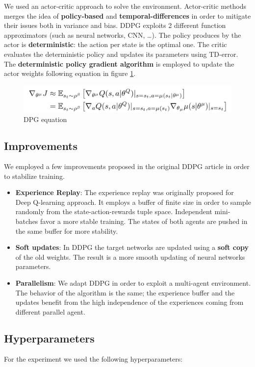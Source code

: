 \documentclass[11pt]{article}
\begin{document}
We used an actor-critic approach to solve the environment. Actor-critic methods
merges the idea of \textbf{policy-based} and \textbf{temporal-differences} in order to
mitigate their issues both in variance and bias. DDPG exploits 2 different
function approximators (such as neural networks, CNN, \ldots{}). The policy produces
by the actor is \textbf{deterministic}: the action per state is the optimal one. The
critic evaluates the deterministic policy and updates its parameters using
TD-error. The \textbf{deterministic policy gradient algorithm} is employed to update
the actor weights following equation in figure \ref{fig:org2db05e2}.


\begin{figure}[htbp]
\centering
\includegraphics[width=.9\linewidth]{../contents/dpg.png}
\caption{\label{fig:org2db05e2}DPG equation}
\end{figure}

\subsection{Improvements}
\label{sec:org2a29a16}
We employed a few improvements proposed in the original DDPG article in order to
stabilize training.

\begin{itemize}
\item \textbf{Experience Replay}: The experience replay was originally proposed for Deep
Q-learning approach. It employs a buffer of finite size in order to sample
randomly from the state-action-rewards tuple space. Independent mini-batches
favor a more stable training. The states of both agents are pushed in the same
buffer for more stability.
\item \textbf{Soft updates}: In DDPG the target networks are updated using a \textbf{soft copy} of
the old weights. The result is a more smooth updating of neural networks
parameters.
\item \textbf{Parallelism}: We adapt DDPG in order to exploit a multi-agent
environment. The behavior of the algorithm is the same; the experience buffer
and the updates benefit from the high independence of the experiences coming
from different parallel agent.
\end{itemize}

\subsection{Hyperparameters}
\label{sec:org3506835}
For the experiment we used the following hyperparameters:
\end{document}
